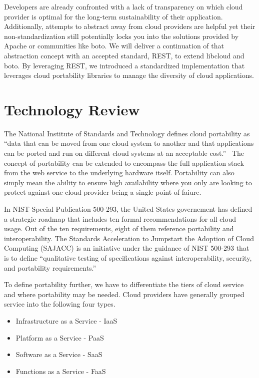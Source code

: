 Developers are already confronted with a lack of transparency on which cloud
provider is optimal for the long-term sustainability of their application.
Additionally, attempts to abstract away from cloud providers are helpful yet
their non-standardization still potentially locks you into the solutions
provided by Apache or communities like boto. We will deliver a continuation of
that abstraction concept with an accepted standard, REST, to extend libcloud
and
boto. By leveraging REST, we introduced a standardized implementation
that leverages cloud portability libraries to manage the diversity of cloud
applications. 

\section{Technology Review}

The National Institute of Standards and Technology defines cloud  portability
as
``data that can be moved from one cloud system to another and that 
applications
can be ported and run on different  cloud systems at an  acceptable
cost.''~\cite{hid-sp18-518-NIST-291} The concept of portability can be extended
to encompass the full application stack from the web service to the underlying
hardware itself. Portability can also simply mean the ability to ensure high
availability where you only are looking to protect against one cloud provider
being a single point of faiure.

In NIST Special Publication 500-293, the United States governement has defined
a
strategic roadmap that includes ten formal recommendations for all cloud usage.
Out of the ten requirements, eight of them reference portability and
interoperability. The Standards Acceleration to Jumpstart the Adoption of Cloud
Computing (SAJACC) is an initiative under the guidance of NIST 500-293 that is
to define ``qualitative testing of specifications against interoperability,
security, and portability requirements.''~\cite{hid-sp18-518-NIST-293}

To define portability further, we have to differentiate the tiers of cloud
service and where portability may be needed. Cloud providers have generally
grouped service into the following four types.

\begin{itemize}
\item
  Infrastructure as a Service - IaaS
\item
  Platform as a Service - PaaS
\item
  Software as a Service - SaaS
\item
  Functions as a Service - FaaS
\end{itemize}

